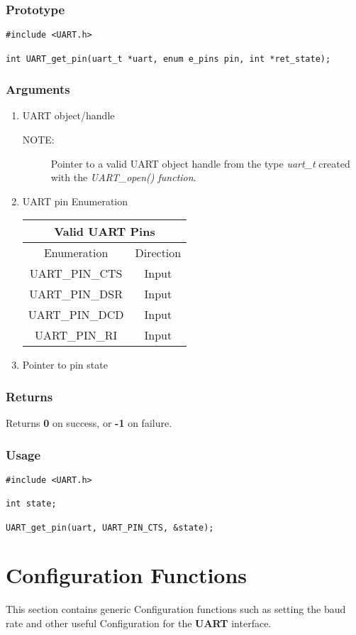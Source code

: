 \documentclass{report}
\begin{document}
\subsubsection*{Prototype}
\begin{lstlisting}
#include <UART.h>

int UART_get_pin(uart_t *uart, enum e_pins pin, int *ret_state);
\end{lstlisting}
\subsubsection*{Arguments}
\begin{enumerate}
\item UART object/handle
\begin{description}
\item[NOTE:] Pointer to a valid UART object handle from the type \textit{uart\_t}
created with the \textit{UART\_open() function}.
\end{description}
\item UART pin Enumeration
\newline
\newline
\begin{tabular}{| c | c |}
\hline
\multicolumn{2}{|c|}{Valid UART Pins} \\
\hline
Enumeration & Direction \\
\hline
UART\_PIN\_CTS & Input \\
UART\_PIN\_DSR & Input \\
UART\_PIN\_DCD & Input \\
UART\_PIN\_RI & Input \\
\hline
\end{tabular}
\item Pointer to pin state
\end{enumerate}
\subsubsection*{Returns}
Returns \textbf{0} on success, or \textbf{-1} on failure.
\subsubsection*{Usage}
\begin{lstlisting}
#include <UART.h>

int state;

UART_get_pin(uart, UART_PIN_CTS, &state);
\end{lstlisting}
\section{Configuration Functions}
This section contains generic Configuration functions such as
setting the baud rate and other useful Configuration for the
\textbf{UART} interface.
\end{document}
